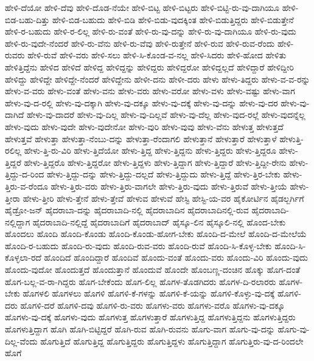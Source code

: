 {ಹೇಳಿ-ದೆಯೋ
ಹೇಳಿ-ದೆವು
ಹೇಳಿ-ದೊಡ-ನೆಯೇ
ಹೇಳಿ-ಬಿಟ್ಟ
ಹೇಳಿ-ಬಿಟ್ಟರು
ಹೇಳಿ-ಬಿಟ್ಟಿ-ರು-ವು-ದಾಗಿಯೂ
ಹೇಳಿ-ಬಿಡ-ಬಹು-ದಿತ್ತು
ಹೇಳಿ-ಬಿಡ-ಬಹುದು
ಹೇಳಿ-ಬಿಡಿ
ಹೇಳಿ-ಬಿಡು-ವುದಕ್ಕಿಂತ
ಹೇಳಿ-ಬಿಡುತ್ತಿದ್ದರು
ಹೇಳಿ-ಬಿಡುತ್ತೇನೆ
ಹೇಳಿ-ರ-ಬಹುದು
ಹೇಳಿ-ರ-ಲಿಲ್ಲ
ಹೇಳಿ-ರು-ವಂತೆ
ಹೇಳಿ-ರು-ವು-ದನ್ನು
ಹೇಳಿ-ರು-ವು-ದಾಗಿಯೂ
ಹೇಳಿ-ರು-ವುದು
ಹೇಳಿ-ರು-ವುದೇ-ನೆಂದರೆ
ಹೇಳಿ-ರು-ವೆನು
ಹೇಳಿ-ರು-ವೆವು
ಹೇಳಿ-ರುತ್ತೇನೆ
ಹೇಳಿ-ರುವ
ಹೇಳಿ-ರುವ-ರೆಂದು
ಹೇಳಿ-ರುವರು
ಹೇಳಿ-ರುವೆ
ಹೇಳಿ-ವರು
ಹೇಳಿ-ಸಲು
ಹೇಳಿ-ಸಿ-ಕೊಂಡ-ವ-ನಲ್ಲ
ಹೇಳಿ-ಸಿದರು
ಹೇಳಿ-ಹೋದ
ಹೇಳಿತು
ಹೇಳಿತ್ತಿದ್ದೆನು
ಹೇಳಿದ
ಹೇಳಿದೆ
ಹೇಳಿದ್ದ
ಹೇಳಿದ್ದನ್ನು
ಹೇಳಿದ್ದರು
ಹೇಳಿದ್ದರೋ
ಹೇಳಿದ್ದಲ್ಲದೆ
ಹೇಳಿದ್ದಾರೆ
ಹೇಳಿದ್ದೀರಿ
ಹೇಳಿದ್ದು
ಹೇಳಿದ್ದೇ
ಹೇಳಿದ್ದೇ-ನೆಂದರೆ
ಹೇಳಿದ್ದೇನು
ಹೇಳೀ-ದನು
ಹೇಳೀ-ದರು
ಹೇಳು
ಹೇಳು-ತಿದ್ದರು
ಹೇಳು-ವ-ವ-ರನ್ನು
ಹೇಳು-ವ-ವರು
ಹೇಳು-ವಂತೆ
ಹೇಳು-ವನು
ಹೇಳು-ವರು
ಹೇಳು-ವರೋ
ಹೇಳು-ವಳು
ಹೇಳು-ವಷ್ಟು
ಹೇಳು-ವಾಗ
ಹೇಳು-ವು-ದ-ರಲ್ಲಿ
ಹೇಳು-ವು-ದಕ್ಕಾಗಿ
ಹೇಳು-ವು-ದಕ್ಕೂ
ಹೇಳು-ವು-ದಕ್ಕೆ
ಹೇಳು-ವು-ದನ್ನು
ಹೇಳು-ವು-ದರ
ಹೇಳು-ವು-ದಾಗಿದೆ
ಹೇಳು-ವು-ದಾದರೆ
ಹೇಳು-ವು-ದಿಲ್ಲ
ಹೇಳು-ವು-ದಿಲ್ಲವೆ
ಹೇಳು-ವು-ದೆಲ್ಲ
ಹೇಳು-ವುದ-ರಲ್ಲೆ
ಹೇಳು-ವುದನ್ನೆಲ್ಲ
ಹೇಳು-ವುದು
ಹೇಳು-ವುದೇ
ಹೇಳು-ವುದೇನೋ
ಹೇಳು-ವುರಿ
ಹೇಳು-ವುವು
ಹೇಳು-ವೆನು
ಹೇಳುತ್ತ
ಹೇಳುತ್ತದೆ
ಹೇಳುತ್ತವೆ
ಹೇಳುತ್ತಾ
ಹೇಳುತ್ತಾ-ನೆಂಬು-ದನ್ನು
ಹೇಳುತ್ತಾ-ರೆಂದಾಗಲಿ
ಹೇಳುತ್ತಾನೆ
ಹೇಳುತ್ತಾರೆ
ಹೇಳುತ್ತಾಳೆ
ಹೇಳುತ್ತಿ-ರಲಿಲ್ಲ
ಹೇಳು-ತ್ತಿ-ರು-ವಿರಿ
ಹೇಳು-ತ್ತಿದೆಯೋ
ಹೇಳು-ತ್ತಿದ್ದ
ಹೇಳು-ತ್ತಿದ್ದನು
ಹೇಳು-ತ್ತಿದ್ದರು
ಹೇಳು-ತ್ತಿದ್ದರೂ
ಹೇಳು-ತ್ತಿದ್ದರೆ
ಹೇಳು-ತ್ತಿದ್ದರೊ
ಹೇಳು-ತ್ತಿದ್ದರೋ
ಹೇಳು-ತ್ತಿದ್ದಳು
ಹೇಳು-ತ್ತಿದ್ದಾಗ
ಹೇಳು-ತ್ತಿದ್ದಾರೆ
ಹೇಳು-ತ್ತಿದ್ದೀ-ರೇನು
ಹೇಳು-ತ್ತಿದ್ದು-ದ-ರಿಂದ
ಹೇಳು-ತ್ತಿದ್ದು-ದನ್ನು
ಹೇಳು-ತ್ತಿದ್ದು-ದಲ್ಲದೆ
ಹೇಳು-ತ್ತಿದ್ದುದು
ಹೇಳು-ತ್ತಿದ್ದೆ
ಹೇಳು-ತ್ತಿರ-ಬೇಕು
ಹೇಳು-ತ್ತಿರು-ವ-ರೆಂದೂ
ಹೇಳು-ತ್ತಿರು-ವರು
ಹೇಳು-ತ್ತಿರು-ವಾಗಲೇ
ಹೇಳು-ತ್ತಿರು-ವುದು
ಹೇಳು-ತ್ತಿರುವೆ
ಹೇಳು-ತ್ತೀಯೆ
ಹೇಳು-ತ್ತೀರಾ
ಹೇಳು-ತ್ತೀರಿ
ಹೇಳು-ತ್ತೇನೆ
ಹೇಳು-ತ್ತೇವೆ
ಹೇಳುವ
ಹೇಳುವೆ
ಹೇಸ್ಟಿ
ಹೇಸ್ಟಿ-ಯ-ವರ
ಹೈಕೋರ್ಟಿನ
ಹೈಡಲ್ಬರ್ಗಿಗೆ
ಹೈಡ್ರೋ-ಜನ್
ಹೈದರಾಬಾ-ದನ್ನು
ಹೈದರಾಬಾದಿ-ನಲ್ಲಿ
ಹೈದರಾಬಾದಿನ
ಹೈದರಾಬಾದಿನಲ್ಲಿ-ರುವ
ಹೈದರಾಬಾದಿ-ನಲ್ಲಿದ್ದಾಗ
ಹೈದರಾಬಾದಿ-ನಲ್ಲಿದ್ದೆ
ಹೈದರಾಬಾದಿಗೆ
ಹೈದರಾಬಾದ್
ಹೈಸ್ಕೂ-ಲಿನ
ಹೈಸ್ಕೂಲಿ-ನಲ್ಲಿ
ಹೊಂದ-ಬೇಕು
ಹೊಂದಲು
ಹೊಂದಿ
ಹೊಂದಿ-ಕೊಂಡು
ಹೊಂದಿ-ಕೊಂಡು-ಹೋಗ-ಬೇಕು
ಹೊಂದಿ-ದ-ಮೇಲೆ
ಹೊಂದಿ-ದ-ಮೇಲೆಯೆ
ಹೊಂದಿ-ರ-ಬಹುದು
ಹೊಂದಿ-ರು-ವುದು
ಹೊಂದಿ-ರುವ-ವರು
ಹೊಂದಿ-ರುವೆ
ಹೊಂದಿ-ಸಿ-ಕೊಳ್ಳ-ಬೇಕು
ಹೊಂದಿ-ಸಿ-ಕೊಳ್ಳಲಾ-ರದೆ
ಹೊಂದಿದೆ
ಹೊಂದಿದ್ದಾರೆ
ಹೊಂದಿವೆ
ಹೊಂದು-ವಂತೆ
ಹೊಂದು-ವರು
ಹೊಂದು-ವಿರಿ
ಹೊಂದು-ವುದು
ಹೊಂದು-ವುದೋ
ಹೊಂದುತ್ತದೆ
ಹೊಂದುತ್ತಾನೆ
ಹೊಂದುವೆ
ಹೊಂದೇ
ಹೊಂಬಣ್ಣ-ದಂಚಿನ
ಹೊಕ್ಕು
ಹೊಗ-ದಂತೆ
ಹೊಗ-ಬಲ್ಲ-ವ-ರಾ-ಗಿದ್ದರು
ಹೊಗ-ಬೇಕೆಂದು
ಹೊಗ-ಲಿಲ್ಲ
ಹೊಗಳ-ತೊಡಗಿದರು
ಹೊಗಳ-ದಿ-ರಲಾರರು
ಹೊಗಳ-ಬೇಕು
ಹೊಗಳಲಿ
ಹೊಗಳಲು
ಹೊಗಳಿ
ಹೊಗಳಿ-ಕೆ-ಗಳನ್ನು
ಹೊಗಳಿ-ಕೆ-ಯನ್ನು
ಹೊಗಳಿ-ಕೊಳ್ಳು-ವು-ದಕ್ಕೆ
ಹೊಗಳಿ-ದರು
ಹೊಗಳಿ-ದರೆ
ಹೊಗಳಿ-ದವು
ಹೊಗಳಿ-ರು-ವರು
ಹೊಗಳು-ವರು
ಹೊಗಳು-ವರೊ
ಹೊಗಳು-ವು-ದಕ್ಕೂ
ಹೊಗಳು-ವು-ದಕ್ಕೆ
ಹೊಗಳು-ವುದು
ಹೊಗಳುತ್ತ
ಹೊಗಳುತ್ತಾರೆ
ಹೊಗಳುತ್ತಿದ್ದ
ಹೊಗಳುತ್ತಿದ್ದನು
ಹೊಗಳುತ್ತಿದ್ದರು
ಹೊಗಳುತ್ತಿದ್ದಾಗ
ಹೊಗಿ
ಹೊಗಿ-ಬಿಟ್ಟಿದ್ದರೆ
ಹೊಗಿ-ರುವ
ಹೊಗಿ-ರುವನು
ಹೊಗು-ವಾಗ
ಹೊಗು-ವು-ದನ್ನು
ಹೊಗು-ವು-ದಿಲ್ಲ-ವೆಂದು
ಹೊಗುತ್ತಿದೆ
ಹೊಗುತ್ತಿದ್ದ
ಹೊಗುತ್ತಿದ್ದರು
ಹೊಗುತ್ತಿದ್ದಳು
ಹೊಗುತ್ತಿದ್ದಾಗ
ಹೊಗುತ್ತಿರು-ವು-ದ-ರಿಂದಲೇ
ಹೊಗೆ
}
